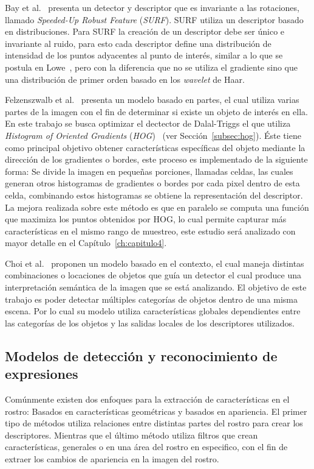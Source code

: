 Bay et al.~\cite{surf2008} presenta un detector y descriptor que es invariante a las rotaciones, llamado \textit{Speeded-Up Robust Feature} (\textit{SURF}). SURF utiliza un descriptor basado en distribuciones. Para SURF la creación de un descriptor debe ser único e invariante al ruido, para esto cada descriptor define una distribución de intensidad de los puntos adyacentes al punto de interés, similar a lo que se postula en Lowe~\cite{sift2004}, pero con la diferencia que no se utiliza el gradiente sino que una distribución de primer orden basado en los \textit{wavelet} de Haar.

Felzenszwalb et al.~\cite{Felzenszwalb2010} presenta un modelo basado en partes,  el cual utiliza varias partes de la imagen con el fin de determinar si existe un objeto de interés en ella. En este trabajo se busca optimizar el dectector de Dalal-Triggs el que utiliza \textit{Histogram of Oriented Gradients} (\textit{HOG})~\cite{hog2005} (ver Sección~\ref{subsec:hog}). Éste tiene como principal objetivo obtener características específicas del objeto mediante la dirección de los gradientes o bordes, este proceso es implementado de la siguiente forma: Se divide la imagen en pequeñas porciones, llamadas celdas, las cuales generan otros histogramas de gradientes o bordes por cada pixel dentro de esta celda, combinando estos histogramas se obtiene la representación del descriptor. La mejora realizada sobre este método es que en paralelo se computa una función que maximiza los puntos obtenidos por HOG, lo cual permite capturar más características en el mismo rango de muestreo, este estudio será analizado con mayor detalle en el Capítulo~\ref{ch:capitulo4}.

Choi et al.~\cite{treebased2012} proponen un modelo basado en el contexto, el cual maneja distintas combinaciones o locaciones de objetos que guía un detector el cual produce una interpretación semántica de la imagen que se está analizando. El objetivo de este trabajo es poder detectar múltiples categorías de objetos dentro de una misma escena. Por lo cual su modelo utiliza características globales dependientes entre las categorías de los objetos y las salidas locales de los descriptores utilizados.

\subsection{Modelos de detección y reconocimiento de expresiones}\label{subsec:expre}
Comúnmente existen dos enfoques para la extracción de características en el rostro: Basados en características geométricas y basados en apariencia. El primer tipo de métodos utiliza relaciones entre distintas partes del rostro para crear los descriptores. Mientras que el último método utiliza filtros que crean características, generales o en una área del rostro en especifico, con el fin de extraer los cambios de apariencia en la imagen del rostro.

